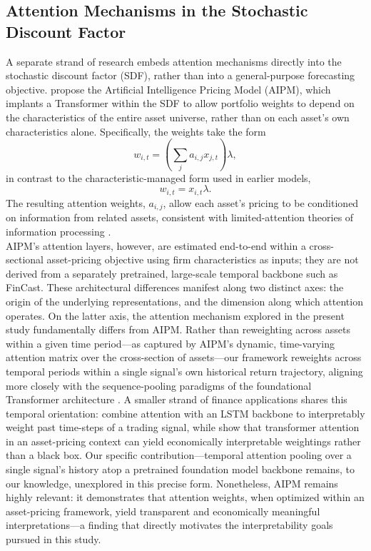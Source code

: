 \documentclass[pdflatex,sn-mathphys-num]{sn-jnl}%
\theoremstyle{thmstyleone}%
\theoremstyle{thmstyletwo}%
\theoremstyle{thmstylethree}%
\begin{document}
\subsection{Attention Mechanisms in the Stochastic Discount Factor}

A separate strand of research embeds attention mechanisms directly into the stochastic discount factor (SDF), rather than into a general-purpose forecasting objective. \citet{kelly2025artificial} propose the Artificial Intelligence Pricing Model (AIPM), which implants a Transformer within the SDF to allow portfolio weights to depend on the characteristics of the entire asset universe, rather than on each asset's own characteristics alone. Specifically, the weights take the form
\[
w_{i,t}
=
\left(
\sum_{j} a_{i,j} x_{j,t}
\right)\lambda,
\]
in contrast to the characteristic-managed form used in earlier models,
\[
w_{i,t} = x_{i,t}\lambda.
\]
The resulting attention weights, \(a_{i,j}\), allow each asset's pricing to be conditioned on information from related assets, consistent with limited-attention theories of information processing \cite{hirshleifer2003limited, barber2008all}.\\

AIPM's attention layers, however, are estimated end-to-end within a cross-sectional asset-pricing objective using firm characteristics as inputs; they are not derived from a separately pretrained, large-scale temporal backbone such as FinCast. These architectural differences manifest along two distinct axes: the origin of the underlying representations, and the dimension along which attention operates. On the latter axis, the attention mechanism explored in the present study fundamentally differs from AIPM. Rather than reweighting across assets within a given time period—as captured by AIPM's dynamic, time-varying attention matrix over the cross-section of assets—our framework reweights across temporal periods within a single signal's own historical return trajectory, aligning more closely with the sequence-pooling paradigms of the foundational Transformer architecture \cite{vaswani2017attention}. A smaller strand of finance applications shares this temporal orientation: \citet{wood2021trading} combine attention with an LSTM backbone to interpretably weight past time-steps of a trading signal, while \citet{ma2023attention} show that transformer attention in an asset-pricing context can yield economically interpretable weightings rather than a black box. Our specific contribution—temporal attention pooling over a single signal's history atop a pretrained foundation model backbone remains, to our knowledge, unexplored in this precise form. Nonetheless, AIPM remains highly relevant: it demonstrates that attention weights, when optimized within an asset-pricing framework, yield transparent and economically meaningful interpretations—a finding that directly motivates the interpretability goals pursued in this study.\\
\end{document}
